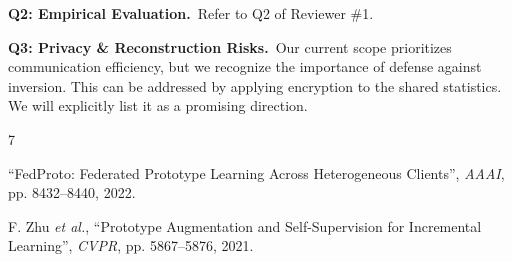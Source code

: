 \documentclass[10pt,twocolumn,letterpaper]{article}
\begin{document}
\noindent\textbf{Q2: Empirical Evaluation.}~Refer to Q2 of Reviewer \#1.

\noindent\textbf{Q3: Privacy \& Reconstruction Risks.}~Our current scope prioritizes communication efficiency, but we recognize the importance of defense against inversion. This can be addressed by applying encryption to the shared statistics. We will explicitly list it as a promising direction.


{
    \small
    \makeatletter
    \providecommand{\backref}[1]{} %
    \renewcommand{\backref}[1]{}   %
    \makeatother

    \begin{thebibliography}{7}




    ``FedProto: Federated Prototype Learning Across Heterogeneous Clients'', \textit{AAAI}, pp. 8432–8440, 2022.

    F. Zhu \textit{et al.}, ``Prototype Augmentation and Self-Supervision for Incremental Learning'', \textit{CVPR}, pp. 5867–5876, 2021.

    \end{thebibliography}
}
\end{document}
